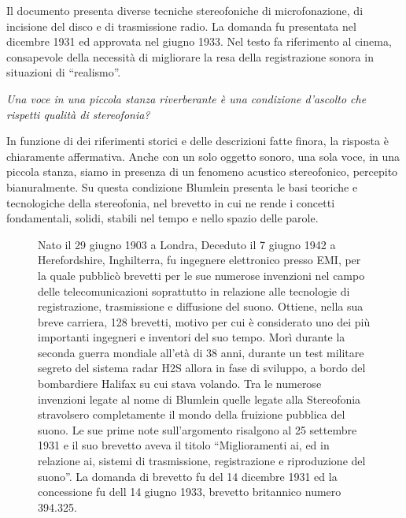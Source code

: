 Il documento presenta diverse tecniche stereofoniche di microfonazione, di
incisione del disco e di trasmissione radio. La domanda fu presentata nel
dicembre 1931 ed approvata nel giugno 1933. Nel testo fa riferimento al cinema,
consapevole della necessità di migliorare la resa della registrazione sonora
in situazioni di “realismo”.

\emph{Una voce in una piccola stanza riverberante è una condizione d'ascolto che
rispetti qualità di stereofonia?}

In funzione di dei riferimenti storici e delle descrizioni fatte finora, la
risposta è chiaramente affermativa. Anche con un solo oggetto sonoro, una sola
voce, in una piccola stanza, siamo in presenza di un fenomeno acustico
stereofonico, percepito bianuralmente. Su questa condizione Blumlein presenta
le basi teoriche e tecnologiche della stereofonia, nel brevetto in cui ne
rende i concetti fondamentali, solidi, stabili nel tempo e nello spazio delle parole.

\vfill\null

\begin{figure}[bh]
\begin{bio}
	Nato il 29 giugno 1903 a Londra, Deceduto il 7 giugno 1942 a Herefordshire,
	Inghilterra, fu ingegnere elettronico presso EMI, per la quale pubblicò brevetti
	per le sue numerose invenzioni nel campo delle telecomunicazioni soprattutto in
	relazione alle tecnologie di registrazione, trasmissione e diffusione del suono.
	Ottiene, nella sua breve carriera, 128 brevetti, motivo per cui è considerato
	uno dei più importanti ingegneri e inventori del suo tempo. Morì durante la
	seconda guerra mondiale all'età di 38 anni, durante un test militare segreto del
	sistema radar H2S allora in fase di sviluppo, a bordo del bombardiere Halifax
	su cui stava volando. Tra le numerose invenzioni legate al nome di Blumlein
	quelle legate alla Stereofonia stravolsero completamente il mondo della
	fruizione pubblica del suono. Le sue prime note sull'argomento risalgono al 25
	settembre 1931 e il suo brevetto aveva il titolo “Miglioramenti ai, ed in
	relazione ai, sistemi di trasmissione, registrazione e riproduzione del suono”.
	La domanda di brevetto fu del 14 dicembre 1931 ed la concessione fu dell
	14 giugno 1933, brevetto britannico numero 394.325.
\end{bio}
\end{figure}

